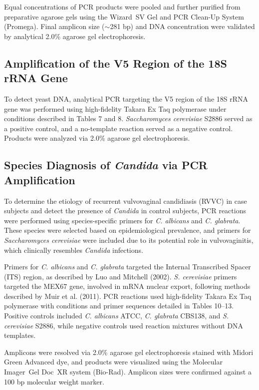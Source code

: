 \documentclass[biotech,article,submit,pdftex,moreauthors]{Definitions/mdpi}
\begin{document}
Equal concentrations of PCR products were pooled and further purified from preparative agarose gels using the Wizard\textregistered~SV Gel and PCR Clean-Up System (Promega). Final amplicon size ($\sim$281 bp) and DNA concentration were validated by analytical 2.0\% agarose gel electrophoresis.

\subsection{Amplification of the V5 Region of the 18S rRNA Gene}
To detect yeast DNA, analytical PCR targeting the V5 region of the 18S rRNA gene was performed using high-fidelity Takara Ex Taq polymerase under conditions described in Tables 7 and 8. \emph{Saccharomyces cerevisiae} S2886 served as a positive control, and a no-template reaction served as a negative control. Products were analyzed via 2.0\% agarose gel electrophoresis.

\subsection{Species Diagnosis of \emph{Candida} via PCR Amplification}
To determine the etiology of recurrent vulvovaginal candidiasis (RVVC) in case subjects and detect the presence of \emph{Candida} in control subjects, PCR reactions were performed using species-specific primers for \emph{C. albicans} and \emph{C. glabrata}. These species were selected based on epidemiological prevalence, and primers for \emph{Saccharomyces cerevisiae} were included due to its potential role in vulvovaginitis, which clinically resembles \emph{Candida} infections. 

Primers for \emph{C. albicans} and \emph{C. glabrata} targeted the Internal Transcribed Spacer (ITS) region, as described by Luo and Mitchell (2002). \emph{S. cerevisiae} primers targeted the MEX67 gene, involved in mRNA nuclear export, following methods described by Muir et al. (2011). PCR reactions used high-fidelity Takara Ex Taq polymerase with conditions and primer sequences detailed in Tables 10--13. Positive controls included \emph{C. albicans} ATCC, \emph{C. glabrata} CBS138, and \emph{S. cerevisiae} S2886, while negative controls used reaction mixtures without DNA templates. 

Amplicons were resolved via 2.0\% agarose gel electrophoresis stained with Midori Green Advanced dye, and products were visualized using the Molecular Imager\textregistered~Gel Doc\texttrademark~XR system (Bio-Rad). Amplicon sizes were confirmed against a 100 bp molecular weight marker. 
\end{document}
